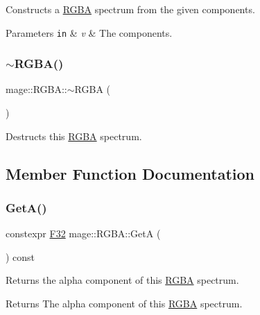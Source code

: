 Constructs a \mbox{\hyperlink{structmage_1_1_r_g_b_a}{R\+G\+BA}} spectrum from the given components.


\begin{DoxyParams}[1]{Parameters}
\mbox{\tt in}  & {\em v} & The components. \\
\hline
\end{DoxyParams}
\mbox{\label{structmage_1_1_r_g_b_a_a139a22381a3fb02d1f28be505b41c9df}} 
\subsubsection{\texorpdfstring{$\sim$\+R\+G\+B\+A()}{~RGBA()}}
{\footnotesize\ttfamily mage\+::\+R\+G\+B\+A\+::$\sim$\+R\+G\+BA (\begin{DoxyParamCaption}{ }\end{DoxyParamCaption})\hspace{0.3cm}{\ttfamily [default]}}

Destructs this \mbox{\hyperlink{structmage_1_1_r_g_b_a}{R\+G\+BA}} spectrum. 

\subsection{Member Function Documentation}
\mbox{\label{structmage_1_1_r_g_b_a_a31196d863851f8e2b178458a78702b42}} 
\subsubsection{\texorpdfstring{Get\+A()}{GetA()}}
{\footnotesize\ttfamily constexpr \mbox{\hyperlink{namespacemage_aa97e833b45f06d60a0a9c4fc22ae02c0}{F32}} mage\+::\+R\+G\+B\+A\+::\+GetA (\begin{DoxyParamCaption}{ }\end{DoxyParamCaption}) const\hspace{0.3cm}{\ttfamily [noexcept]}}

Returns the alpha component of this \mbox{\hyperlink{structmage_1_1_r_g_b_a}{R\+G\+BA}} spectrum.

\begin{DoxyReturn}{Returns}
The alpha component of this \mbox{\hyperlink{structmage_1_1_r_g_b_a}{R\+G\+BA}} spectrum. 
\end{DoxyReturn}
\mbox{\label{structmage_1_1_r_g_b_a_ae4fd67f400f6c86c5c7614ba3b06feeb}} 
